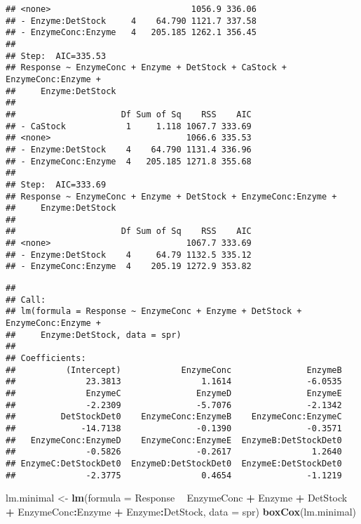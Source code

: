\documentclass[
]{article}
\newenvironment{Shaded}{\begin{snugshade}}{\end{snugshade}}
\newcommand{\DataTypeTok}[1]{\textcolor[rgb]{0.13,0.29,0.53}{#1}}
\newcommand{\KeywordTok}[1]{\textcolor[rgb]{0.13,0.29,0.53}{\textbf{#1}}}
\newcommand{\NormalTok}[1]{#1}
\newcommand{\OperatorTok}[1]{\textcolor[rgb]{0.81,0.36,0.00}{\textbf{#1}}}
\newcommand{\StringTok}[1]{\textcolor[rgb]{0.31,0.60,0.02}{#1}}
\begin{document}
\begin{verbatim}
## <none>                            1056.9 336.06
## - Enzyme:DetStock     4    64.790 1121.7 337.58
## - EnzymeConc:Enzyme   4   205.185 1262.1 356.45
## 
## Step:  AIC=335.53
## Response ~ EnzymeConc + Enzyme + DetStock + CaStock + EnzymeConc:Enzyme + 
##     Enzyme:DetStock
## 
##                     Df Sum of Sq    RSS    AIC
## - CaStock            1     1.118 1067.7 333.69
## <none>                           1066.6 335.53
## - Enzyme:DetStock    4    64.790 1131.4 336.96
## - EnzymeConc:Enzyme  4   205.185 1271.8 355.68
## 
## Step:  AIC=333.69
## Response ~ EnzymeConc + Enzyme + DetStock + EnzymeConc:Enzyme + 
##     Enzyme:DetStock
## 
##                     Df Sum of Sq    RSS    AIC
## <none>                           1067.7 333.69
## - Enzyme:DetStock    4     64.79 1132.5 335.12
## - EnzymeConc:Enzyme  4    205.19 1272.9 353.82
\end{verbatim}

\begin{verbatim}
## 
## Call:
## lm(formula = Response ~ EnzymeConc + Enzyme + DetStock + EnzymeConc:Enzyme + 
##     Enzyme:DetStock, data = spr)
## 
## Coefficients:
##          (Intercept)            EnzymeConc               EnzymeB  
##              23.3813                1.1614               -6.0535  
##              EnzymeC               EnzymeD               EnzymeE  
##              -2.2309               -5.7076               -2.1342  
##         DetStockDet0    EnzymeConc:EnzymeB    EnzymeConc:EnzymeC  
##             -14.7138               -0.1390               -0.3571  
##   EnzymeConc:EnzymeD    EnzymeConc:EnzymeE  EnzymeB:DetStockDet0  
##              -0.5826               -0.2617                1.2640  
## EnzymeC:DetStockDet0  EnzymeD:DetStockDet0  EnzymeE:DetStockDet0  
##              -2.3775                0.4654               -1.1219
\end{verbatim}

\begin{Shaded}
\begin{Highlighting}[]
\NormalTok{lm.minimal <-}\StringTok{ }\KeywordTok{lm}\NormalTok{(}\DataTypeTok{formula =}\NormalTok{ Response }\OperatorTok{~}\StringTok{ }\NormalTok{EnzymeConc }\OperatorTok{+}\StringTok{ }\NormalTok{Enzyme }\OperatorTok{+}\StringTok{ }\NormalTok{DetStock }\OperatorTok{+}\StringTok{ }\NormalTok{EnzymeConc}\OperatorTok{:}\NormalTok{Enzyme }\OperatorTok{+}\StringTok{ }
\StringTok{    }\NormalTok{Enzyme}\OperatorTok{:}\NormalTok{DetStock, }\DataTypeTok{data =}\NormalTok{ spr)}
\KeywordTok{boxCox}\NormalTok{(lm.minimal)}
\end{Highlighting}
\end{Shaded}
\end{document}
